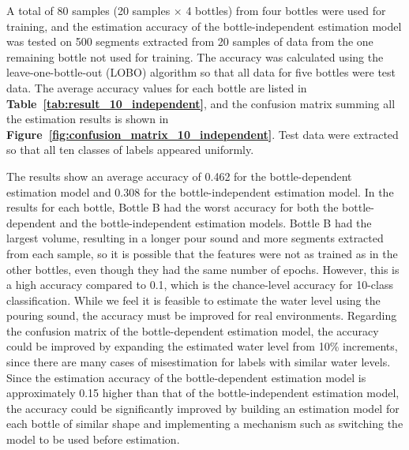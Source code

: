 \documentclass[manuscript,screen,anonymous,review]{acmart}
\newcommand\figref[1]{\textbf{Figure~\ref{fig:#1}}}
\newcommand\tabref[1]{\textbf{Table~\ref{tab:#1}}}
\begin{document}
A total of 80 samples (20 samples $\times$ 4 bottles) from four bottles were used for training, and the estimation accuracy of the bottle-independent estimation model was tested on 500 segments extracted from 20 samples of data from the one remaining bottle not used for training. The accuracy was calculated using the leave-one-bottle-out (LOBO) algorithm so that all data for five bottles were test data. The average accuracy values for each bottle are listed in \tabref{result_10_independent}, and the confusion matrix summing all the estimation results is shown in \figref{confusion_matrix_10_independent}. Test data were extracted so that all ten classes of labels appeared uniformly.\par

The results show an average accuracy of 0.462 for the bottle-dependent estimation model and 0.308 for the bottle-independent estimation model. In the results for each bottle, Bottle B had the worst accuracy for both the bottle-dependent and the bottle-independent estimation models. Bottle B had the largest volume, resulting in a longer pour sound and more segments extracted from each sample, so it is possible that the features were not as trained as in the other bottles, even though they had the same number of epochs. However, this is a high accuracy compared to 0.1, which is the chance-level accuracy for 10-class classification. While we feel it is feasible to estimate the water level using the pouring sound, the accuracy must be improved for real environments. Regarding the confusion matrix of the bottle-dependent estimation model, the accuracy could be improved by expanding the estimated water level from 10\% increments, since there are many cases of misestimation for labels with similar water levels. Since the estimation accuracy of the bottle-dependent estimation model is approximately 0.15 higher than that of the bottle-independent estimation model, the accuracy could be significantly improved by building an estimation model for each bottle of similar shape and implementing a mechanism such as switching the model to be used before estimation.
\end{document}
